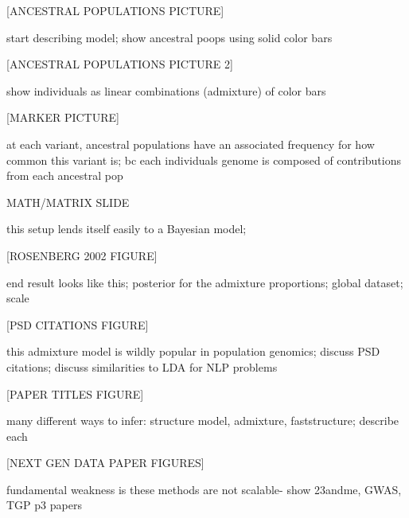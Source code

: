 \documentclass[serif,14pt]{beamer}
\begin{document}
\begin{frame}

[ANCESTRAL POPULATIONS PICTURE]

start describing model; show ancestral poops using solid color bars
\end{frame}

\begin{frame}

[ANCESTRAL POPULATIONS PICTURE 2]

show individuals as linear combinations (admixture) of color bars
\end{frame}

\begin{frame}

[MARKER PICTURE]

at each variant, ancestral populations have an associated frequency for how common this variant is; bc each individuals genome is composed of contributions from each ancestral pop
\end{frame}

\begin{frame}

MATH/MATRIX SLIDE

this setup lends itself easily to a Bayesian model; 
\end{frame}

\begin{frame}

[ROSENBERG 2002 FIGURE]

end result looks like this; posterior for the admixture proportions; global dataset; scale
\end{frame}

\begin{frame}

[PSD CITATIONS FIGURE]

this admixture model is wildly popular in population genomics; discuss PSD citations; discuss similarities to LDA for NLP problems
\end{frame}

\begin{frame}

[PAPER TITLES FIGURE]

many different ways to infer: structure model, admixture, faststructure; describe each
\end{frame}

\begin{frame}

[NEXT GEN DATA PAPER FIGURES]

fundamental weakness is these methods are not scalable- show 23andme, GWAS, TGP p3 papers
\end{frame}
\end{document}
